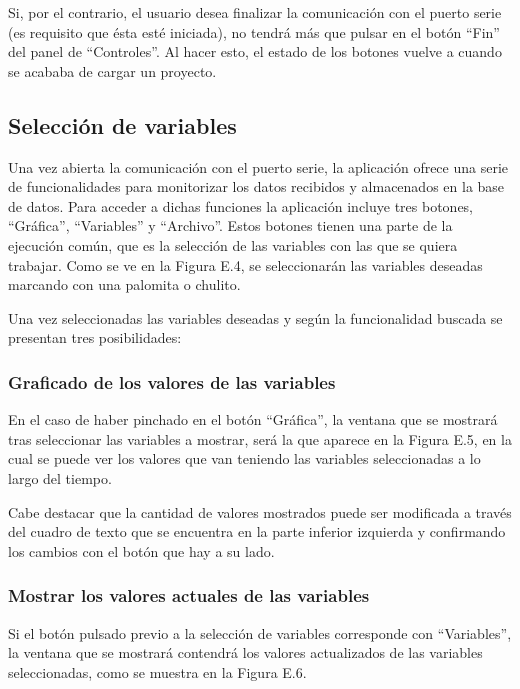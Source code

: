 Si, por el contrario, el usuario desea finalizar la comunicación con el puerto serie (es requisito que ésta esté iniciada), no tendrá más que pulsar en el botón ``Fin'' del panel de ``Controles''. Al hacer esto, el estado de los botones vuelve a cuando se acababa de cargar un proyecto.

\subsection{Selección de variables}

Una vez abierta la comunicación con el puerto serie, la aplicación ofrece una serie de funcionalidades para monitorizar los datos recibidos y almacenados en la base de datos. Para acceder a dichas funciones la aplicación incluye tres botones, ``Gráfica'', ``Variables'' y ``Archivo''. Estos botones tienen una parte de la ejecución común, que es la selección de las variables con las que se quiera trabajar. Como se ve en la Figura E.4, se seleccionarán las variables deseadas marcando con una palomita o chulito.


Una vez seleccionadas las variables deseadas y según la funcionalidad buscada se presentan tres posibilidades:

\subsubsection{Graficado de los valores de las variables}

En el caso de haber pinchado en el botón ``Gráfica'', la ventana que se mostrará tras seleccionar las variables a mostrar, será la que aparece en la Figura E.5, en la cual se puede ver los valores que van teniendo las variables seleccionadas a lo largo del tiempo.


Cabe destacar que la cantidad de valores mostrados puede ser modificada a través del cuadro de texto que se encuentra en la parte inferior izquierda y confirmando los cambios con el botón que hay a su lado.

\subsubsection{Mostrar los valores actuales de las variables}

Si el botón pulsado previo a la selección de variables corresponde con ``Variables'', la ventana que se mostrará contendrá los valores actualizados de las variables seleccionadas, como se muestra en la Figura E.6.

